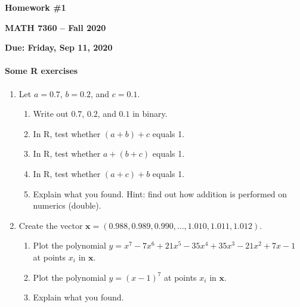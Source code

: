 \documentclass[12pt]{report}
\newcommand{\Vec}[1]{\bm{#1}}
\begin{document}
\centerline{ {\Large
\textbf{Homework \#1}
}}
\centerline{ {\Large 
\textbf{MATH 7360 -- Fall 2020}
}}
\centerline{ {
\textbf{Due: Friday, Sep 11, 2020}
}}

\paragraph{Some R exercises}

\begin{enumerate}
\item Let $a = 0.7$, $b = 0.2$,  and $c = 0.1$. 
     \begin{enumerate}[label=(\alph*)]
     	\item Write out $0.7$, $0.2$, and $0.1$ in binary.
    	\item In R, test whether $(a + b) + c$ equals 1.
	\item In R, test whether $a + (b + c)$ equals 1.
	\item In R, test whether $(a + c) + b$ equals 1.
	\item Explain what you found.  Hint: find out how addition is performed on numerics (double).
     \end{enumerate}

\item Create the vector $\Vec{x} = (0.988, 0.989, 0.990, \dots, 1.010, 1.011, 1.012)$.
    \begin{enumerate}[label=(\alph*)]
	\item Plot the polynomial $y = x^7 - 7 x^6 + 21 x^5 - 35x^4 + 35x^3 - 21 x^2 + 7x -1$ at points $x_i$ in $\Vec{x}$.
	\item Plot the polynomial $y = (x - 1)^7$ at points $x_i$ in $\Vec{x}$.
	\item Explain what you found.
    \end{enumerate}


\end{enumerate}
\end{document}
